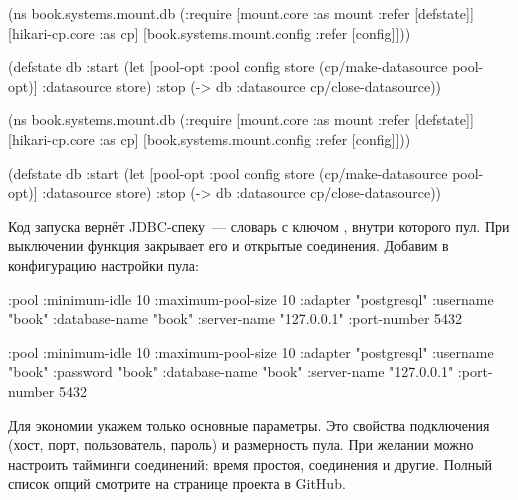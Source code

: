 \ifnarrow

\begin{clojure}
(ns book.systems.mount.db
  (:require
   [mount.core :as mount
    :refer [defstate]]
   [hikari-cp.core :as cp]
   [book.systems.mount.config
    :refer [config]]))

(defstate db
  :start
  (let [{pool-opt :pool} config
        store (cp/make-datasource
                pool-opt)]
    {:datasource store})
  :stop
  (-> db
      :datasource
      cp/close-datasource))
\end{clojure}

\else

\begin{clojure}
(ns book.systems.mount.db
  (:require
   [mount.core :as mount :refer [defstate]]
   [hikari-cp.core :as cp]
   [book.systems.mount.config :refer [config]]))

(defstate db
  :start
  (let [{pool-opt :pool} config
        store (cp/make-datasource pool-opt)]
    {:datasource store})
  :stop
  (-> db :datasource cp/close-datasource))
\end{clojure}

\fi


Код запуска вернёт JDBC-спеку~--- словарь с ключом ,
внутри которого пул. При выключении функция  закрывает
его и открытые соединения. Добавим в конфигурацию настройки пула:

\ifafive

\begin{clojure}
{:pool {:minimum-idle       10
        :maximum-pool-size  10
        :adapter            "postgresql"
        :username           "book"
        :database-name      "book"
        :server-name        "127.0.0.1"
        :port-number        5432}}
\end{clojure}

\else

\begin{clojure}
{:pool {:minimum-idle       10
        :maximum-pool-size  10
        :adapter            "postgresql"
        :username           "book"
        :password           "book"
        :database-name      "book"
        :server-name        "127.0.0.1"
        :port-number        5432}}
\end{clojure}

\fi

Для экономии укажем только основные параметры. Это свойства подключения (хост,
порт, пользователь, пароль) и размерность пула. При желании можно настроить
тайминги соединений: время простоя, соединения и другие. Полный список опций
смотрите на странице проекта в GitHub.

